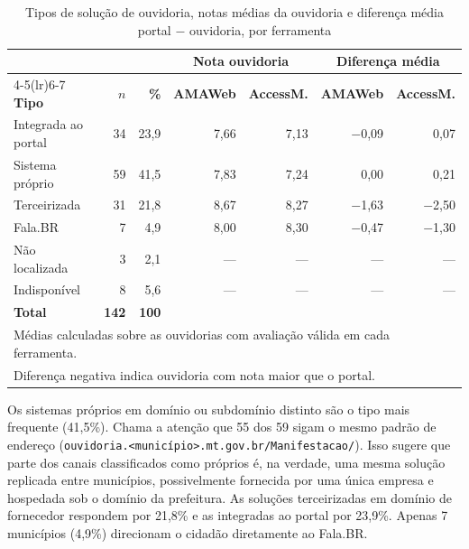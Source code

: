 \documentclass[12pt]{article}
\begin{document}
\begin{table}[ht]
\centering
\caption{Tipos de solução de ouvidoria, notas médias da ouvidoria e diferença média portal $-$ ouvidoria, por ferramenta}
\label{tab:tipos}
\small
\setlength{\tabcolsep}{4pt}
\begin{tabular}{lrrrrrr}
\toprule
 & & & \multicolumn{2}{c}{\textbf{Nota ouvidoria}} & \multicolumn{2}{c}{\textbf{Diferença média}} \\
\cmidrule(lr){4-5}\cmidrule(lr){6-7}
\textbf{Tipo} & \textbf{$n$} & \textbf{\%} & \textbf{AMAWeb} & \textbf{AccessM.} & \textbf{AMAWeb} & \textbf{AccessM.} \\
\midrule
Integrada ao portal                  & 34 & 23,9 & 7,66 & 7,13 & $-$0,09 &    0,07 \\
Sistema próprio                      & 59 & 41,5 & 7,83 & 7,24 &    0,00 &    0,21 \\
Terceirizada                         & 31 & 21,8 & 8,67 & 8,27 & $-$1,63 & $-$2,50 \\
Fala.BR                              &  7 &  4,9 & 8,00 & 8,30 & $-$0,47 & $-$1,30 \\
Não localizada                       &  3 &  2,1 &  --- &  --- &     --- &     --- \\
Indisponível                         &  8 &  5,6 &  --- &  --- &     --- &     --- \\
\midrule
\textbf{Total}                       & \textbf{142} & \textbf{100} & & & & \\
\bottomrule
\multicolumn{7}{l}{\footnotesize Médias calculadas sobre as ouvidorias com avaliação válida em cada ferramenta.} \\
\multicolumn{7}{l}{\footnotesize Diferença negativa indica ouvidoria com nota maior que o portal.}
\end{tabular}
\end{table}

Os sistemas próprios em domínio ou subdomínio distinto são o tipo mais frequente (41,5\%). Chama a atenção que 55 dos 59 sigam o mesmo padrão de endereço (\texttt{ouvidoria.<município>.mt.gov.br/Manifestacao/}). Isso sugere que parte dos canais classificados como próprios é, na verdade, uma mesma solução replicada entre municípios, possivelmente fornecida por uma única empresa e hospedada sob o domínio da prefeitura. As soluções terceirizadas em domínio de fornecedor respondem por 21,8\% e as integradas ao portal por 23,9\%. Apenas 7 municípios (4,9\%) direcionam o cidadão diretamente ao Fala.BR.
\end{document}
